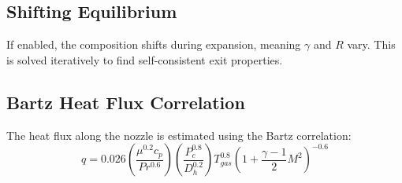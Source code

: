 \subsection{Shifting Equilibrium}
If enabled, the composition shifts during expansion, meaning \(\gamma\) and \(R\) vary. This is solved iteratively to find self-consistent exit properties.

\subsection{Bartz Heat Flux Correlation}
The heat flux along the nozzle is estimated using the Bartz correlation:
\begin{equation}
q = 0.026 \left( \frac{\mu^{0.2} c_p}{Pr^{0.6}} \right) \left( \frac{P_c^{0.8}}{D_h^{0.2}} \right) T_{gas}^{0.8} \left( 1 + \frac{\gamma-1}{2} M^2 \right)^{-0.6}
\end{equation}

